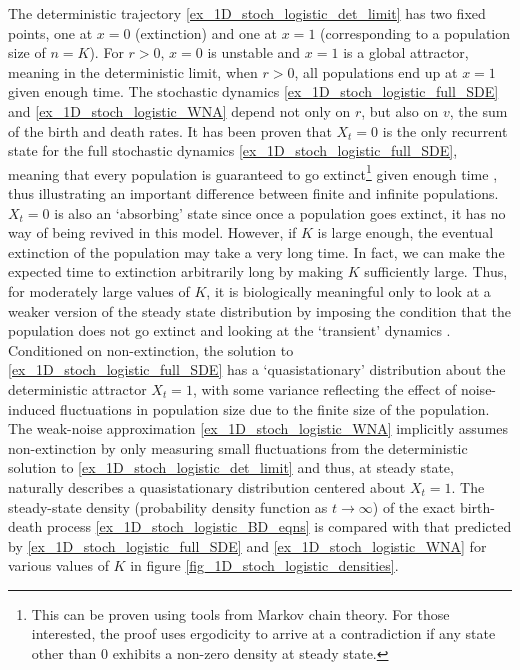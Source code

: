 The deterministic trajectory \eqref{ex_1D_stoch_logistic_det_limit} has two fixed points, one at $x=0$ (extinction) and one at $x=1$ (corresponding to a population size of $n=K$). For $r > 0$, $x=0$ is unstable and $x=1$ is a global attractor, meaning in the deterministic limit, when $r > 0$, all populations end up at $x=1$ given enough time. The stochastic dynamics \eqref{ex_1D_stoch_logistic_full_SDE} and \eqref{ex_1D_stoch_logistic_WNA} depend not only on $r$, but also on $v$, the sum of the birth and death rates. It has been proven that $X_t = 0$ is the only recurrent state for the full stochastic dynamics \eqref{ex_1D_stoch_logistic_full_SDE}, meaning that every population is guaranteed to go extinct\footnote{This can be proven using tools from Markov chain theory. For those interested, the proof uses ergodicity to arrive at a contradiction if any state other than $0$ exhibits a non-zero density at steady state.} given enough time \citep{nasell_extinction_2001}, thus illustrating an important difference between finite and infinite populations. $X_t = 0$ is also an `absorbing' state since once a population goes extinct, it has no way of being revived in this model. However, if $K$ is large enough, the eventual extinction of the population may take a very long time. In fact, we can make the expected time to extinction arbitrarily long by making $K$ sufficiently large. Thus, for moderately large values of $K$, it is biologically meaningful only to look at a weaker version of the steady state distribution by imposing the condition that the population does not go extinct and looking at the `transient' dynamics \citep{hastings_transients_2004}. Conditioned on non-extinction, the solution to \eqref{ex_1D_stoch_logistic_full_SDE} has a `quasistationary' distribution about the deterministic attractor $X_t = 1$, with some variance reflecting the effect of noise-induced fluctuations in population size \citep{nasell_extinction_2001} due to the finite size of the population. The weak-noise approximation \eqref{ex_1D_stoch_logistic_WNA} implicitly assumes non-extinction by only measuring small fluctuations from the deterministic solution to \eqref{ex_1D_stoch_logistic_det_limit} and thus, at steady state, naturally describes a quasistationary distribution centered about $X_t = 1$. The steady-state density (probability density function as $t \to \infty$) of the exact birth-death process \eqref{ex_1D_stoch_logistic_BD_eqns} is compared with that predicted by \eqref{ex_1D_stoch_logistic_full_SDE} and \eqref{ex_1D_stoch_logistic_WNA} for various values of $K$ in figure \ref{fig_1D_stoch_logistic_densities}.


